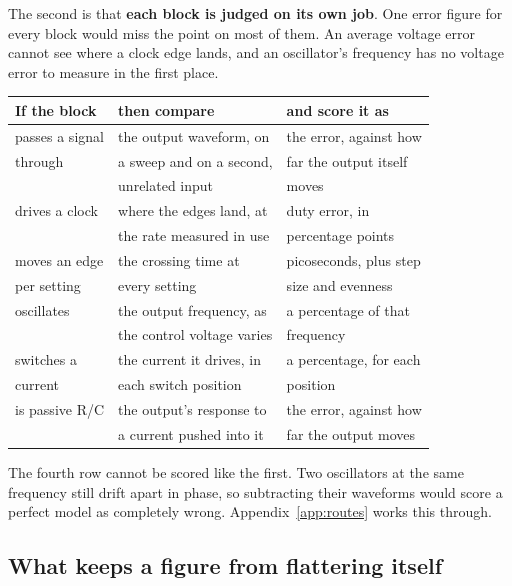 \documentclass[11pt,a4paper]{article}
\begin{document}
The second is that \textbf{each block is judged on its own job}. One
error figure for every block would miss the point on most of them. An
average voltage error cannot see where a clock edge lands, and an
oscillator's frequency has no voltage error to measure in the first
place.

\begin{center}
\begin{tabular}{@{}lll@{}}
\toprule
\textbf{If the block} & \textbf{then compare} & \textbf{and score it as} \\
\midrule
passes a signal   & the output waveform, on    & the error, against how \\
through           & a sweep and on a second,   & far the output itself \\
                  & unrelated input            & moves \\[0.3em]
drives a clock    & where the edges land, at   & duty error, in \\
                  & the rate measured in use   & percentage points \\[0.3em]
moves an edge     & the crossing time at       & picoseconds, plus step \\
per setting       & every setting              & size and evenness \\[0.3em]
oscillates        & the output frequency, as   & a percentage of that \\
                  & the control voltage varies & frequency \\[0.3em]
switches a        & the current it drives, in  & a percentage, for each \\
current           & each switch position       & position \\[0.3em]
is passive R/C    & the output's response to   & the error, against how \\
                  & a current pushed into it   & far the output moves \\
\bottomrule
\end{tabular}
\end{center}

\noindent The fourth row cannot be scored like the first. Two
oscillators at the same frequency still drift apart in phase, so
subtracting their waveforms would score a perfect model as completely
wrong. Appendix~\ref{app:routes} works this through.

\subsection{What keeps a figure from flattering itself}
\end{document}
